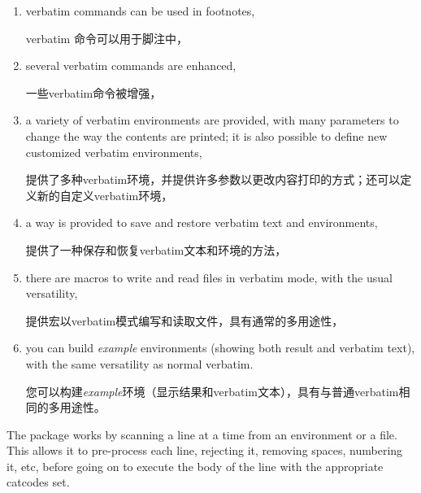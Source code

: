 \documentclass[twoside]{article}
\newcommand\verbatimTxt{抄录}
\begin{document}
\begin{enumerate}
\item verbatim commands can be used in footnotes,\par
verbatim 命令可以用于脚注中，

\item several verbatim commands are enhanced, {\par}
一些verbatim命令被增强，

\item a variety of verbatim environments are provided, with many
parameters to change the way the contents are printed; it is also possible
to define new customized verbatim environments,{\par}
提供了多种verbatim环境，并提供许多参数以更改内容打印的方式；还可以定义新的自定义verbatim环境，

\item a way is provided to save and restore verbatim text and environments,{\par}
提供了一种保存和恢复verbatim文本和环境的方法，

\item there are macros to write and read files in verbatim mode, with the
usual versatility,{\par}
提供宏以verbatim模式编写和读取文件，具有通常的多用途性，

\item you can build \emph{example} environments (showing both result and
verbatim text), with the same versatility as normal verbatim.{\par}
您可以构建\emph{example}环境（显示结果和verbatim文本），具有与普通verbatim相同的多用途性。
\end{enumerate}

The package works by scanning a line at a time from an environment or a
file. This allows it to pre-process each line, rejecting it, removing
spaces, numbering it, etc, before going on to execute the body of the line
with the appropriate catcodes set.
\end{document}
